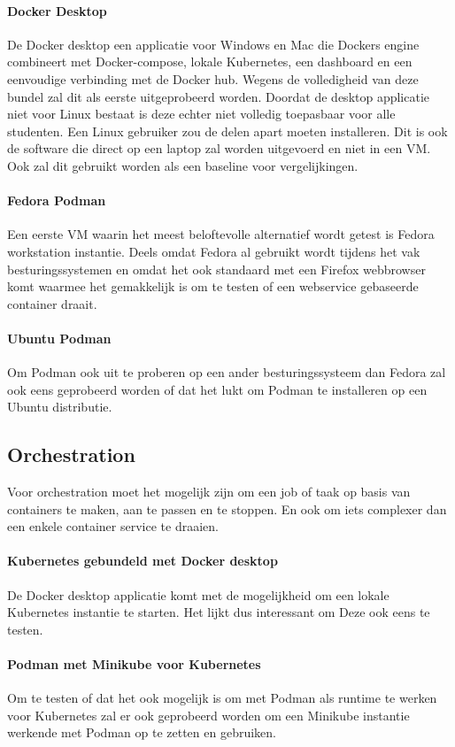 \paragraph{Docker Desktop}
De Docker desktop een applicatie voor Windows en Mac die Dockers engine combineert met Docker-compose, lokale Kubernetes, een dashboard en een eenvoudige verbinding met de Docker hub. Wegens de volledigheid van deze bundel zal dit als eerste uitgeprobeerd worden. Doordat de desktop applicatie niet voor Linux bestaat is deze echter niet volledig toepasbaar voor alle studenten. Een Linux gebruiker zou de delen apart moeten installeren. Dit is ook de software die direct op een laptop zal worden uitgevoerd en niet in een VM. Ook zal dit gebruikt worden als een baseline voor vergelijkingen. 

\paragraph{Fedora Podman}
Een eerste VM waarin het meest beloftevolle alternatief wordt getest is Fedora workstation instantie. Deels omdat Fedora al gebruikt wordt tijdens het vak besturingssystemen en omdat het ook standaard met een Firefox webbrowser komt waarmee het gemakkelijk is om te testen of een webservice gebaseerde container draait.

\paragraph{Ubuntu Podman}
Om Podman ook uit te proberen op een ander besturingssysteem dan Fedora zal ook eens geprobeerd worden of dat het lukt om Podman te installeren op een Ubuntu distributie.

\subsection{Orchestration}
Voor orchestration moet het mogelijk zijn om een job of taak op basis van containers te maken, aan te passen en te stoppen. En ook om iets complexer dan een enkele container service te draaien.

\paragraph{Kubernetes gebundeld met Docker desktop}
De Docker desktop applicatie komt met de mogelijkheid om een lokale Kubernetes instantie te starten. Het lijkt dus interessant om Deze ook eens te testen.

\paragraph{Podman met Minikube voor Kubernetes}
Om te testen of dat het ook mogelijk is om met Podman als runtime te werken voor Kubernetes zal er ook geprobeerd worden om een Minikube instantie werkende met Podman op te zetten en gebruiken.

